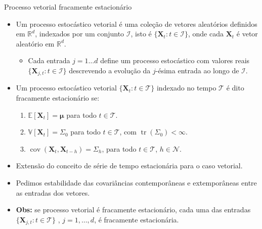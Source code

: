 \documentclass[11pt]{beamer}
\begin{document}
\begin{frame}{Processo vetorial fracamente estacionário}
\begin{itemize}
		\item Um processo estocástico vetorial é uma coleção de vetores aleatórios definidos em $\mathbb{R}^d$, indexados por um conjunto $\mathcal{I}$, isto é $\{\boldsymbol{X}_t: t \in \mathcal{I}\}$, onde cada $\boldsymbol{X}_t$ é vetor aleatório em $\mathbb{R}^d$.
		\begin{itemize}
			\item Cada entrada $j = 1\ldots d$ define um processo estocástico com valores reais $\{\boldsymbol{X}_{j,t}: t \in \mathcal{I}\}$ descrevendo a evolução da $j$-ésima entrada ao longo de $\mathcal{I}$.
		\end{itemize}
	\item Um processo estocástico vetorial $\{\boldsymbol{X}_t: t \in \mathcal{T}\}$ indexado no tempo $ \mathcal{T}$ é dito fracamente estacionário se:
	
	\begin{enumerate}
		\item$ \mathbb{E}[\boldsymbol{X}_t] = \boldsymbol{\mu}$ para todo $t \in \mathcal{T}$.
		\item $ \mathbb{V}[\boldsymbol{X}_t] = \Sigma_0$ para todo $t \in \mathcal{T}$, com $\operatorname{tr}(\Sigma_0) < \infty$.
		\item $\operatorname{cov}(\boldsymbol{X}_t,\boldsymbol{X}_{t-h}) = \Sigma_h$, para todo $t \in \mathcal{T}$, $h \in \mathcal{N}$.
	\end{enumerate}
	\item Extensão do conceito de série de tempo estacionária para o caso vetorial.
	\item Pedimos estabilidade das covariâncias contemporâneas e extemporâneas entre as entradas dos vetores.
	\item \textbf{Obs:} se processo vetorial é fracamente estacionário, cada uma das entradas $\{\boldsymbol{X}_{j,t}: t \in \mathcal{T}\}$ , $j =1,\ldots, d$, é fracamente estacionária.
\end{itemize}
\end{frame}
\end{document}
